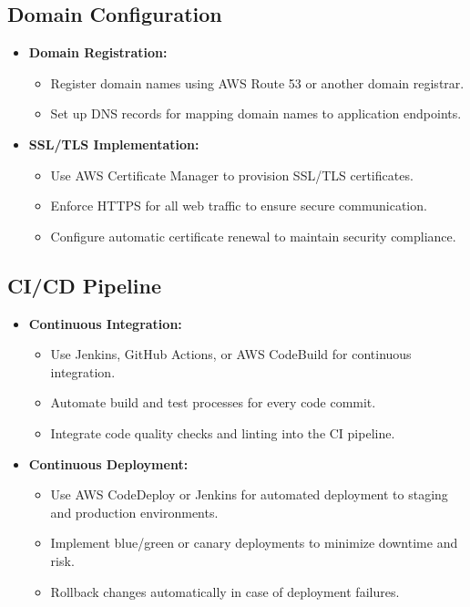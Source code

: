 \subsection{Domain Configuration}
\begin{itemize}[leftmargin=*]
    \item \textbf{Domain Registration:}
    \begin{itemize}
        \item Register domain names using AWS Route 53 or another domain registrar.
        \item Set up DNS records for mapping domain names to application endpoints.
    \end{itemize}
    
    \item \textbf{SSL/TLS Implementation:}
    \begin{itemize}
        \item Use AWS Certificate Manager to provision SSL/TLS certificates.
        \item Enforce HTTPS for all web traffic to ensure secure communication.
        \item Configure automatic certificate renewal to maintain security compliance.
    \end{itemize}
\end{itemize}

\subsection{CI/CD Pipeline}
\begin{itemize}[leftmargin=*]
    \item \textbf{Continuous Integration:}
    \begin{itemize}
        \item Use Jenkins, GitHub Actions, or AWS CodeBuild for continuous integration.
        \item Automate build and test processes for every code commit.
        \item Integrate code quality checks and linting into the CI pipeline.
    \end{itemize}
    
    \item \textbf{Continuous Deployment:}
    \begin{itemize}
        \item Use AWS CodeDeploy or Jenkins for automated deployment to staging and production environments.
        \item Implement blue/green or canary deployments to minimize downtime and risk.
        \item Rollback changes automatically in case of deployment failures.
    \end{itemize}
\end{itemize}

